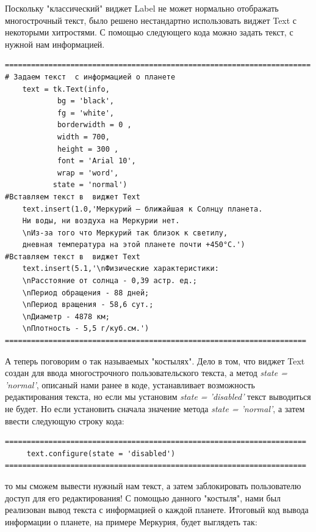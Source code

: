 \documentclass[11pt,a4paper]{report}
\begin{document}
Поскольку "классический" виджет Label не может нормально отображать многострочный текст, было решено нестандартно использовать виджет Text с некоторыми хитростями. 
С помощью следующего кода можно задать текст, с нужной нам информацией. 
\begin{verbatim}
======================================================================
# Задаем текст  с информацией о планете
    text = tk.Text(info,
            bg = 'black',
            fg = 'white',
            borderwidth = 0 ,
            width = 700, 
            height = 300 , 
            font = 'Arial 10', 
            wrap = 'word', 
           state = 'normal')
#Вставляем текст в  виджет Text    
    text.insert(1.0,'Меркурий — ближайшая к Солнцу планета. 
    Ни воды, ни воздуха на Меркурии нет. 
    \nИз-за того что Меркурий так близок к светилу,
    дневная температура на этой планете почти +450°С.')
#Вставляем текст в  виджет Text        
    text.insert(5.1,'\nФизические характеристики:
    \nРасстояние от солнца - 0,39 астр. ед.;
    \nПериод обращения - 88 дней;
    \nПериод вращения - 58,6 сут.;
    \nДиаметр - 4878 км;
    \nПлотность - 5,5 г/куб.см.')
=====================================================================
\end{verbatim}
 А теперь поговорим о так называемых "костылях". Дело в том, что виджет Text создан для ввода многострочного пользовательского текста, а метод \textit{state = 'normal'}, описаный нами ранее в коде, устанавливает возможность редактирования текста, но если мы установим \textit{state = 'disabled'} текст выводиться не будет. Но если установить сначала значение метода  \textit{state = 'normal'}, а затем ввести следующую строку кода:
 \begin{verbatim}
=====================================================================
     text.configure(state = 'disabled')
=====================================================================
 \end{verbatim}
то мы сможем вывести нужный нам текст, а затем заблокировать пользователю доступ для его редактирования!
С помощью данного "костыля", нами был реализован вывод текста с информацией о каждой планете.
Итоговый код вывода информации о планете, на примере Меркурия, будет выглядеть так:
\end{document}
